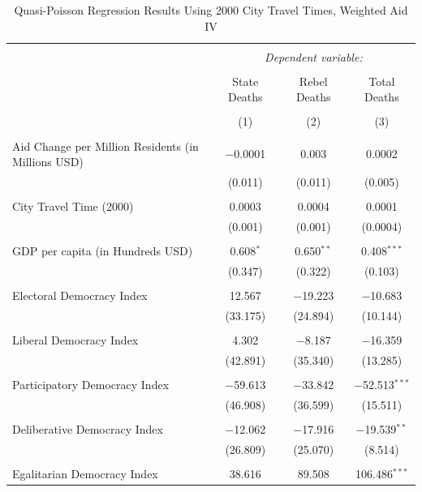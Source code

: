 \documentclass[12pt, letterpaper]{article}
\begin{document}
\begin{table}[!htbp] \centering 
	\caption{Quasi-Poisson Regression Results Using 2000 City Travel Times, Weighted Aid IV} 
	\begin{tabular}{@{\extracolsep{5pt}}lccc} 
		\\[-1.8ex]\hline 
		\hline \\[-1.8ex] 
		& \multicolumn{3}{c}{\textit{Dependent variable:}} \\ 
		\cline{2-4} 
		\\[-1.8ex] & State Deaths & Rebel Deaths & Total Deaths \\ 
		\\[-1.8ex] & (1) & (2) & (3)\\ 
		\hline \\[-1.8ex] 
		Aid Change per Million Residents (in Millions USD) & $-$0.0001 & 0.003 & 0.0002 \\ 
		& (0.011) & (0.011) & (0.005) \\ 
		& & & \\ 
		City Travel Time (2000) & 0.0003 & 0.0004 & 0.0001 \\ 
		& (0.001) & (0.001) & (0.0004) \\ 
		& & & \\ 
		GDP per capita (in Hundreds USD) & 0.608$^{*}$ & 0.650$^{**}$ & 0.408$^{***}$ \\ 
		& (0.347) & (0.322) & (0.103) \\ 
		& & & \\ 
		Electoral Democracy Index & 12.567 & $-$19.223 & $-$10.683 \\ 
		& (33.175) & (24.894) & (10.144) \\ 
		& & & \\ 
		Liberal Democracy Index & 4.302 & $-$8.187 & $-$16.359 \\ 
		& (42.891) & (35.340) & (13.285) \\ 
		& & & \\ 
		Participatory Democracy Index & $-$59.613 & $-$33.842 & $-$52.513$^{***}$ \\ 
		& (46.908) & (36.599) & (15.511) \\ 
		& & & \\ 
		Deliberative Democracy Index & $-$12.062 & $-$17.916 & $-$19.539$^{**}$ \\ 
		& (26.809) & (25.070) & (8.514) \\ 
		& & & \\ 
		Egalitarian Democracy Index & 38.616 & 89.508 & 106.486$^{***}$ \\ 

\end{tabular}
\end{table}
\end{document}
